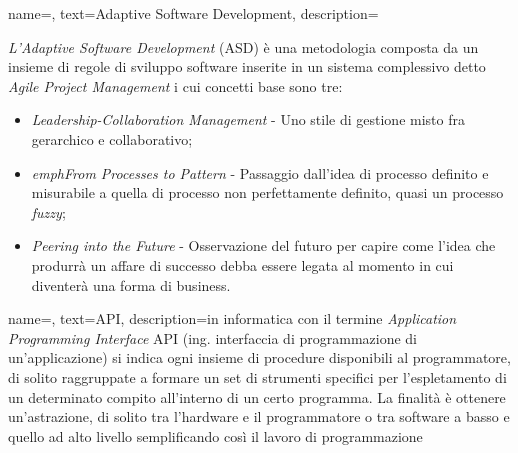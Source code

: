 
\renewcommand{\acronymname}{Acronimi e abbreviazioni}


{
    name=,
    text=Adaptive Software Development,
    description={\emph{L’Adaptive Software Development} (ASD) è una
metodologia composta da un insieme di regole di sviluppo software inserite in un
sistema complessivo detto \emph{Agile Project Management} i cui concetti base sono tre:
\begin{itemize}
	\item \emph{Leadership-Collaboration Management} - Uno stile di gestione misto fra gerarchico e collaborativo;
	\item \emph{emphFrom Processes to Pattern} - Passaggio dall’idea di processo definito e
misurabile a quella di processo non perfettamente definito, quasi un processo \emph{fuzzy};
	\item \emph{Peering into the Future} - Osservazione del futuro per capire come l’idea che produrrà un affare di successo debba essere legata al momento in cui diventerà una forma di business.
\end{itemize}}
}

{
    name=,
    text=API,
    description={in informatica con il termine \emph{Application Programming
Interface} API (ing. interfaccia di programmazione di un’applicazione) si
indica ogni insieme di procedure disponibili al programmatore, di solito raggruppate
a formare un set di strumenti specifici per l’espletamento di un determinato
compito all’interno di un certo programma. La finalità è ottenere un’astrazione,
di solito tra l’hardware e il programmatore o tra software a basso e quello ad alto
livello semplificando così il lavoro di programmazione}
}

